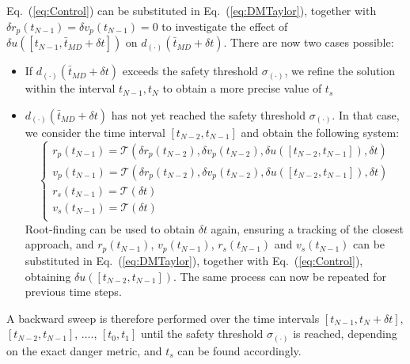 \documentclass[letterpaper, preprint, paper,11pt]{AAS}	%
\renewcommand{\eqref}[1]{Eq.~(\ref{#1})}
\begin{document}
\eqref{eq:Control} can be substituted in \eqref{eq:DMTaylor}, together with $\delta r_p(t_{N-1}) = \delta v_p(t_{N-1}) = 0$ to investigate the effect of $\delta u([t_{N-1}, \bar{t}_{MD} + \delta t])$ on $d_{(\cdot)}(\bar{t}_{MD} + \delta t)$. There are now two cases possible:

\begin{itemize}
	\item If $d_{(\cdot)}(\bar{t}_{MD} + \delta t)$ exceeds the safety threshold $\sigma_{(\cdot)}$, we refine the solution within the interval $t_{N-1}, t_{N}$ to obtain a more precise value of $t_s$
	\item $d_{(\cdot)}(\bar{t}_{MD} + \delta t)$ has not yet reached the safety threshold $\sigma_{(\cdot)}$. In that case, we consider the time interval $[t_{N-2}, t_{N-1}]$ and obtain the following system: 
	\begin{equation}\label{eq:TaylorsBack2}
		\begin{cases}
			r_p(t_{N-1}) = \mathcal{T}(\delta r_p(t_{N-2}), \delta v_p(t_{N-2}), \delta u([t_{N-2}, t_{N-1}]), \delta t) \\
			v_p(t_{N-1}) = \mathcal{T}(\delta r_p(t_{N-2}), \delta v_p(t_{N-2}), \delta u([t_{N-2}, t_{N-1}]), \delta t) \\
			r_s(t_{N-1}) = \mathcal{T}(\delta t) \\
			v_s(t_{N-1}) = \mathcal{T}(\delta t) \\
		\end{cases}
	\end{equation}
	Root-finding can be used to obtain $\delta t$ again, ensuring a tracking of the closest approach, and $r_p(t_{N-1})$, $v_p(t_{N-1})$, $r_s(t_{N-1})$ and $v_s(t_{N-1})$ can be substituted in \eqref{eq:DMTaylor}, together with \eqref{eq:Control}, obtaining $\delta u([t_{N-2}, t_{N-1}])$. The same process can now be repeated for previous time steps.
\end{itemize}

A backward sweep is therefore performed over the time intervals $[t_{N - 1}, t_N + \delta t ]$, $[t_{N-2}, t_{N-1}]$, ...., $[t_0, t_1]$ until the safety threshold $\sigma_{(\cdot)}$ is reached, depending on the exact danger metric, and $t_s$ can be found accordingly.
\end{document}
